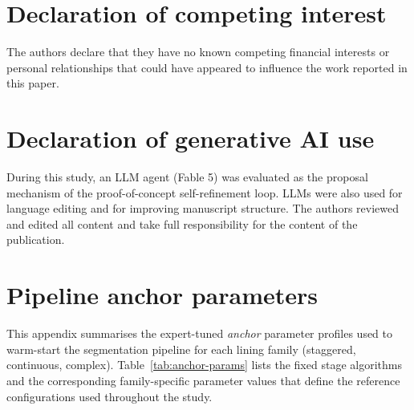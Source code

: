 \documentclass[a4paper,fleqn]{cas-dc}
\begin{document}
{\section*{Declaration of competing interest}

The authors declare that they have no known competing financial interests or personal relationships that could have appeared to influence the work reported in this paper.

\section*{Declaration of generative AI use}

During this study, an LLM agent (Fable 5) was evaluated as the proposal mechanism of the proof-of-concept self-refinement loop. LLMs were also used for language editing and for improving manuscript structure. The authors reviewed and edited all content and take full responsibility for the content of the publication.









\appendix

\section{Pipeline anchor parameters}\label{app:anchor-parameter}

This appendix summarises the expert-tuned \emph{anchor} parameter profiles used to warm-start the segmentation pipeline for each lining family (staggered, continuous, complex). Table~\ref{tab:anchor-params} lists the fixed stage algorithms and the corresponding family-specific parameter values that define the reference configurations used throughout the study.

}
\end{document}
